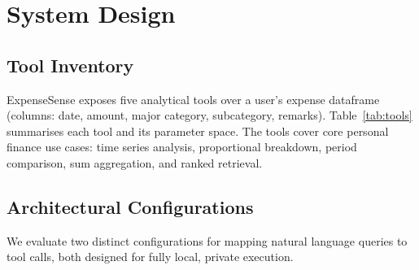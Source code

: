 \documentclass[11pt,twocolumn]{article}
\begin{document}
\section{System Design}

\subsection{Tool Inventory}

ExpenseSense exposes five analytical tools over a user's expense dataframe (columns: date, amount, major category, subcategory, remarks).
Table~\ref{tab:tools} summarises each tool and its parameter space.
The tools cover core personal finance use cases: time series analysis, proportional breakdown, period comparison, sum aggregation, and ranked retrieval.

\begin{table}[t]
\centering
\small
{}
\caption{Tool inventory. The five tools span visualisation (1--3), aggregation (4), and retrieval (5).}
\label{tab:tools}
\end{table}

\subsection{Architectural Configurations}

We evaluate two distinct configurations for mapping natural language queries to tool calls, both designed for fully local, private execution.
\end{document}
